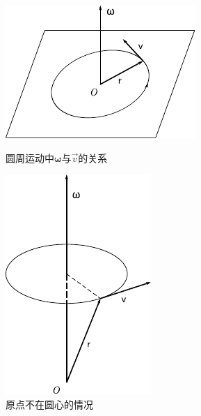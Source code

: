 \begin{figure}[!h]
    \small
    \begin{minipage}[b]{15em}
        \centering
        \includegraphics{figure/fig01.20}
        \vspace{4em}
        \caption{圆周运动中$\boldsymbol{\omega}$与$\vec{v}$的关系}
        \label{fig:01.20}
    \end{minipage}
    \hfill
    \begin{minipage}[b]{13em}
        \centering
        \includegraphics{figure/fig01.21}
        \vspace{1em}
        \caption{原点不在圆心的情况}
        \label{fig:01.21}
\end{minipage}
\end{figure}

